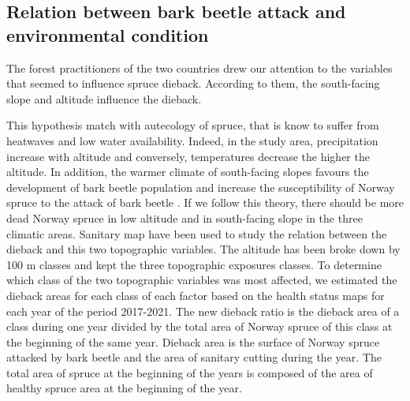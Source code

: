 \documentclass[3p,procedia]{elsarticle}
\begin{document}
\subsection{Relation between bark beetle attack and environmental condition}




The forest practitioners of the two countries drew our attention to the variables that seemed to influence spruce dieback.
According to them, the south-facing slope and altitude influence the dieback.

This hypothesis match with autecology of spruce, that is know to suffer from heatwaves and low water availability.
Indeed, in the study area, precipitation increase with altitude and conversely, temperatures decrease the higher the altitude.
In addition, the warmer climate of south-facing slopes favours the development of bark beetle population \citep{annila_influence_1969, baier_phenipscomprehensive_2007, jonsson_2009, marini_climate_2012} and increase the susceptibility of Norway spruce to the attack of bark beetle \citep{wermelinger_ecology_2004, netherer_waterlimiting_2015}.
If we follow this theory, there should be more dead Norway spruce in low altitude and in south-facing slope in the three climatic areas.  
Sanitary map have been used to study the relation between the dieback and this two topographic variables.
The altitude has been broke down  by 100 m classes and kept the three topographic exposures classes.
To determine which class of the two topographic variables was most affected, we estimated the dieback areas for each class of each factor based on the health status maps for each year of the period 2017-2021.
The  new dieback ratio is  the dieback area of a class during one year divided by the total area of Norway spruce of this class at the beginning of the same year. 
Dieback area is the surface of Norway spruce attacked by bark beetle and the area of sanitary cutting during the year. 
The total area of spruce at the beginning of the years is composed of the area of healthy spruce area at the beginning of the year. 
\end{document}
